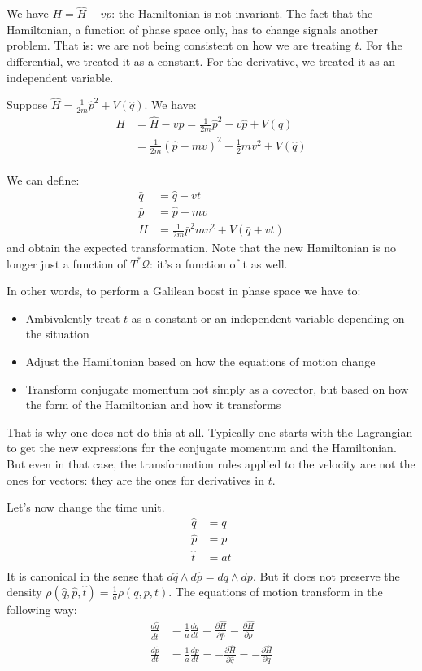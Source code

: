 \documentclass[aps,pra,10pt,twocolumn,floatfix,nofootinbib]{revtex4-1}
\theoremstyle{definition}
\begin{document}
We have $H = \hat{H} - vp$: the Hamiltonian is not invariant. The fact that the Hamiltonian, a function of phase space only, has to change signals another problem. That is: we are not being consistent on how we are treating $t$. For the differential, we treated it as a constant. For the derivative, we treated it as an independent variable.

Suppose $\hat{H} = \frac{1}{2m} \hat{p}^2 + V(\hat{q})$. We have:
\begin{align*}
H &= \hat{H} - vp = \frac{1}{2m} \hat{p}^2 -v\hat{p} + V(\hat{q})\\
&= \frac{1}{2m} (\hat{p} - mv)^2 - \frac{1}{2} mv^2 + V(\hat{q}) \\
\end{align*}

We can define:
\begin{align*}
\bar{q} &= \hat{q} - vt \\
\bar{p} &= \hat{p} - mv \\
\bar{H} &= \frac{1}{2m} \bar{p}^2 mv^2 + V(\bar{q} + vt)
\end{align*}
and obtain the expected transformation. Note that the new Hamiltonian is no longer just a function of $T^*\mathcal{Q}$: it's a function of t as well.

In other words, to perform a Galilean boost in phase space we have to:
\begin{itemize}
	\item Ambivalently treat $t$ as a constant or an independent variable depending on the situation
	\item Adjust the Hamiltonian based on how the equations of motion change
	\item Transform conjugate momentum not simply as a covector, but based on how the form of the Hamiltonian and how it transforms
\end{itemize}

That is why one does not do this at all. Typically one starts with the Lagrangian to get the new expressions for the conjugate momentum and the Hamiltonian. But even in that case, the transformation rules applied to the velocity are not the ones for vectors: they are the ones for derivatives in $t$.

Let's now change the time unit.
\begin{align*}
\hat{q} &= q \\
\hat{p} &= p \\
\hat{t} &= a t \\
\end{align*}
It is canonical in the sense that $d\hat{q} \wedge d\hat{p} = dq \wedge dp$. But it does not preserve the density $\rho(\hat{q},\hat{p},\hat{t}) =\frac{1}{a} \rho(q,p,t)$. The equations of motion transform in the following way:
\begin{align*}
\frac{d\hat{q}}{d\hat{t}} &= \frac{1}{a} \frac{dq}{dt}= \frac{\partial \hat{H}}{\partial \hat{p}}= \frac{\partial \hat{H}}{\partial p} \\
\frac{d\hat{p}}{dt} &= \frac{1}{a} \frac{dp}{dt} = - \frac{\partial \hat{H}}{\partial \hat{q}} = - \frac{\partial \hat{H}}{\partial q}
\end{align*}
\end{document}
